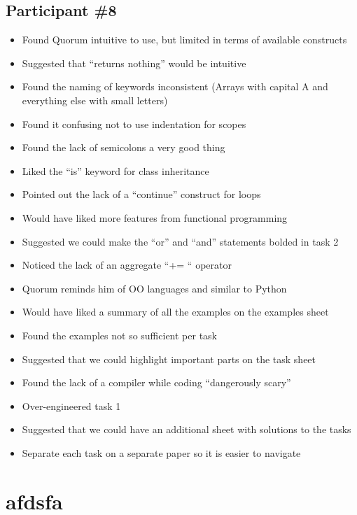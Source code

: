 \section{Participant {\#}8}
\begin{itemize}
\item Found Quorum intuitive to use, but limited in terms of available constructs
\item Suggested that “returns nothing” would be intuitive
\item Found the naming of keywords inconsistent (Arrays with capital A and everything else with small letters)
\item Found it confusing not to use indentation for scopes
\item Found the lack of semicolons a very good thing
\item Liked the “is” keyword for class inheritance
\item Pointed out the lack of a “continue” construct for loops
\item Would have liked more features from functional programming
\item Suggested we could make the “or” and “and” statements bolded in task 2
\item Noticed the lack of an aggregate “+= “ operator
\item Quorum reminds him of OO languages and similar to Python
\item Would have liked a summary of all the examples on the examples sheet
\item Found the examples not so sufficient per task
\item Suggested that we could highlight important parts on the task sheet 
\item Found the lack of a compiler while coding “dangerously scary”
\item Over-engineered task 1 
\item Suggested that we could have an additional sheet with solutions to the tasks
\item Separate each task on a separate paper so it is easier to navigate 
\end{itemize}
\chapter{afdsfa}
